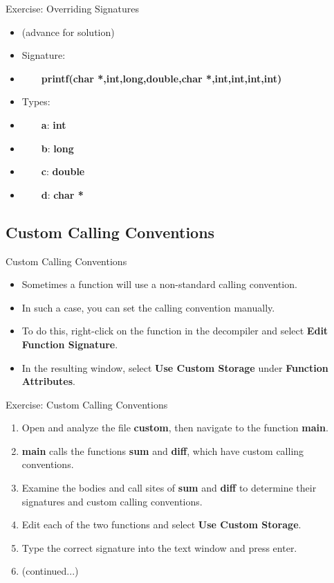 \documentclass{beamer}
\begin{document}
\begin{frame}
\begin{block}{Exercise: Overriding Signatures}
\begin{itemize}
\item[] (advance for solution)
\pause
\item Signature:
\item[] ~~~~\textbf{printf(char *,int,long,double,char *,int,int,int,int)}
\item Types:
\item[] ~~~~\textbf{a}: \textbf{int}
\item[] ~~~~\textbf{b}: \textbf{long}
\item[] ~~~~\textbf{c}: \textbf{double}
\item[] ~~~~\textbf{d}: \textbf{char *}
\end{itemize}
\end{block}
\end{frame}

\subsection{Custom Calling Conventions}
\begin{frame}
\begin{block}{Custom Calling Conventions}
\begin{itemize}
\item Sometimes a function will use a non-standard calling convention.
\item In such a case, you can set the calling convention manually.
\item To do this, right-click on the function in the decompiler and select \textbf{Edit Function Signature}.
\item In the resulting window, select \textbf{Use Custom Storage} under \textbf{Function Attributes}.
\end{itemize}
\end{block}
\end{frame}

\begin{frame}
\begin{block}{Exercise: Custom Calling Conventions}
\begin{enumerate}
\item Open and analyze the file \textbf{custom}, then navigate to the function \textbf{main}. 
\item \textbf{main} calls the functions \textbf{sum} and \textbf{diff}, which have custom calling conventions.
\item Examine the bodies and call sites of \textbf{sum} and \textbf{diff} to determine their signatures and custom calling conventions.
\item Edit each of the two functions and select \textbf{Use Custom Storage}.
\item Type the correct signature into the text window and press enter.
\item[] (continued...)
\end{enumerate}
\end{block}
\end{frame}
\end{document}
